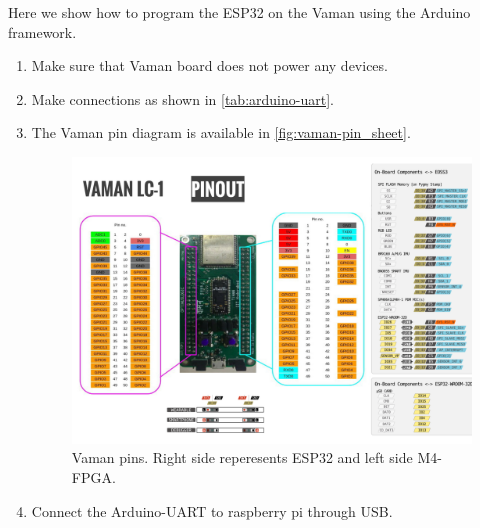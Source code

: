 Here we show how to program the ESP32 on the Vaman using the Arduino framework.
\begin{enumerate}[label=\arabic*.,ref=\theenumi]
\item Make sure that Vaman board does not power any devices.  
\item Make connections as shown in \autoref{tab:arduino-uart}.
\item The Vaman pin diagram is available in \autoref{fig:vaman-pin_sheet}.

\begin{figure}
\centering
\includegraphics[width=\columnwidth]{vaman-esp32/lcd/figs/pin_sheet.png}
\caption{Vaman pins.  Right side reperesents ESP32 and left side M4-FPGA.}
\label{fig:vaman-pin_sheet}
\end{figure}
\begin{table}[!ht]

\caption{}
\label{tab:arduino-uart}
\end{table}
%
\item Connect the Arduino-UART to raspberry pi through USB.  

\end{enumerate}

